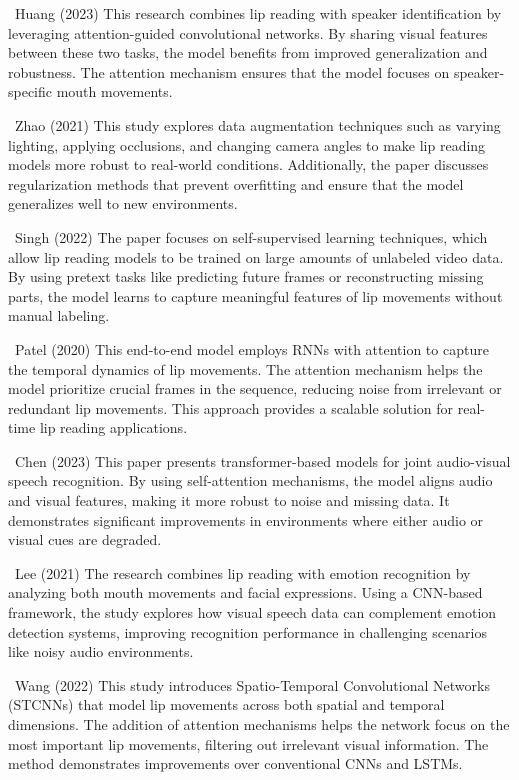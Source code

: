 \documentclass[conference]{IEEEtran}
\begin{document}
\ Huang (2023) This research combines lip reading with speaker identification by leveraging attention-guided convolutional networks. By sharing visual features between these two tasks, the model benefits from improved generalization and robustness. The attention mechanism ensures that the model focuses on speaker-specific mouth movements.

\ Zhao (2021) This study explores data augmentation techniques such as varying lighting, applying occlusions, and changing camera angles to make lip reading models more robust to real-world conditions. Additionally, the paper discusses regularization methods that prevent overfitting and ensure that the model generalizes well to new environments.

\ Singh (2022) The paper focuses on self-supervised learning techniques, which allow lip reading models to be trained on large amounts of unlabeled video data. By using pretext tasks like predicting future frames or reconstructing missing parts, the model learns to capture meaningful features of lip movements without manual labeling.

\ Patel (2020) This end-to-end model employs RNNs with attention to capture the temporal dynamics of lip movements. The attention mechanism helps the model prioritize crucial frames in the sequence, reducing noise from irrelevant or redundant lip movements. This approach provides a scalable solution for real-time lip reading applications.

\ Chen (2023) This paper presents transformer-based models for joint audio-visual speech recognition. By using self-attention mechanisms, the model aligns audio and visual features, making it more robust to noise and missing data. It demonstrates significant improvements in environments where either audio or visual cues are degraded.

\ Lee (2021) The research combines lip reading with emotion recognition by analyzing both mouth movements and facial expressions. Using a CNN-based framework, the study explores how visual speech data can complement emotion detection systems, improving recognition performance in challenging scenarios like noisy audio environments.

\ Wang (2022) This study introduces Spatio-Temporal Convolutional Networks (STCNNs) that model lip movements across both spatial and temporal dimensions. The addition of attention mechanisms helps the network focus on the most important lip movements, filtering out irrelevant visual information. The method demonstrates improvements over conventional CNNs and LSTMs.
\end{document}
